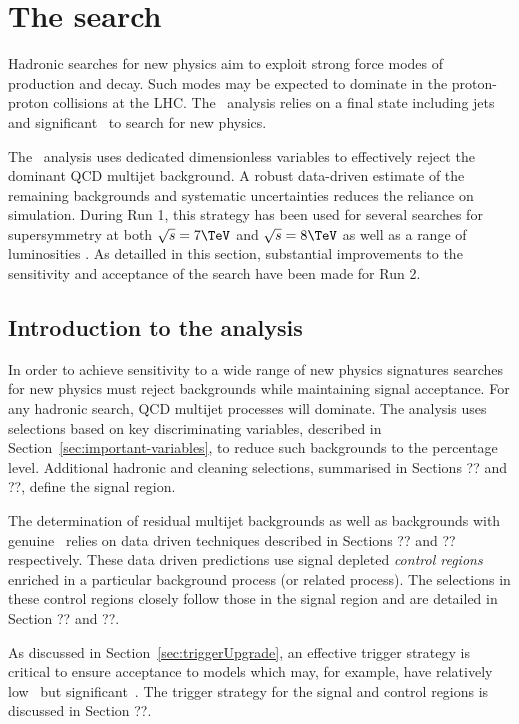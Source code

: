 \chapter{The \alphat search}

Hadronic searches for new physics aim to exploit strong force modes of 
production and decay. Such modes may be expected to dominate in the 
proton-proton collisions at the LHC. The \alphat~analysis relies on a
final state including jets and significant \met~to search for new physics.

The \alphat~analysis uses dedicated dimensionless variables to effectively reject the
dominant QCD multijet background. A robust data-driven estimate of the remaining
backgrounds and systematic uncertainties reduces the reliance on simulation.
During Run 1, this strategy has been used for several searches for supersymmetry at
both $\sqrt{s} = 7 \TeV$ and $\sqrt{s} = 8 \TeV$ as well as a range of luminosities
\cite{alphaT1,alphaT2,alphaT3,alphaT4}. As detailled in this section, substantial 
improvements to the sensitivity and acceptance of the search have been made for Run 2.

\section{Introduction to the \alphat analysis}

In order to achieve sensitivity to a wide range of new physics signatures
searches for new physics must reject backgrounds while maintaining signal acceptance.
For any hadronic search, QCD multijet processes will dominate. The
\alphat analysis uses selections based on key discriminating variables,
described in Section~\ref{sec:important-variables}, to reduce such backgrounds
to the percentage level. Additional hadronic and cleaning selections, summarised in
Sections ?? and ??, define the signal region. 

The determination of residual multijet backgrounds as well as backgrounds with 
genuine \met~relies on data driven techniques described in Sections ?? and ?? respectively.
These data driven predictions use signal depleted \emph{control regions} enriched in a particular
background process (or related process). The selections in
these control regions closely follow those in the signal region and are detailed in 
Section ?? and ??.

As discussed in Section~\ref{sec:triggerUpgrade}, an effective trigger strategy is 
critical to ensure acceptance to models which may, for example, have relatively low
\scalht~but significant~\mht. The trigger strategy for the signal and control regions
is discussed in Section ??.

